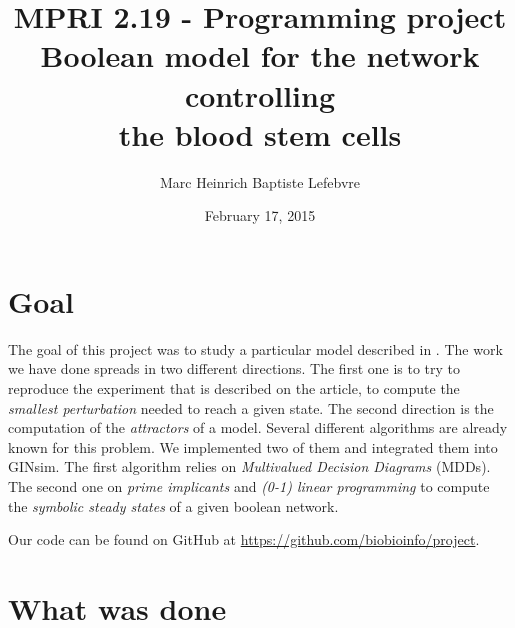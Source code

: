 \documentclass[a4paper,11pt]{article}
\author{Marc Heinrich \hspace{20mm} Baptiste Lefebvre}
\title{MPRI 2.19 - Programming project \\ Boolean model for the network controlling \\ the blood stem cells}
\date{February 17, 2015}
\begin{document}
\maketitle

\section{Goal}




The goal of this project was to study a particular model described in
\cite{Bonzanni}. The work we have done spreads in two different directions. The
first one is to try to reproduce the experiment that is described on the
article, to compute the \emph{smallest perturbation} needed to reach a given
state. The second direction is the computation of the \emph{attractors} of a
model. Several different algorithms are already known for this problem. We
implemented two of them and integrated them into GINsim. The first algorithm
relies on \emph{Multivalued Decision Diagrams} (MDDs). The second one on
\emph{prime implicants} and \emph{(0-1) linear programming} to compute the
\emph{symbolic steady states} of a given boolean network.

Our code can be found on GitHub at
\href{https://github.com/biobioinfo/project}{https://github.com/biobioinfo/project}.

\section{What was done}



\end{document}
